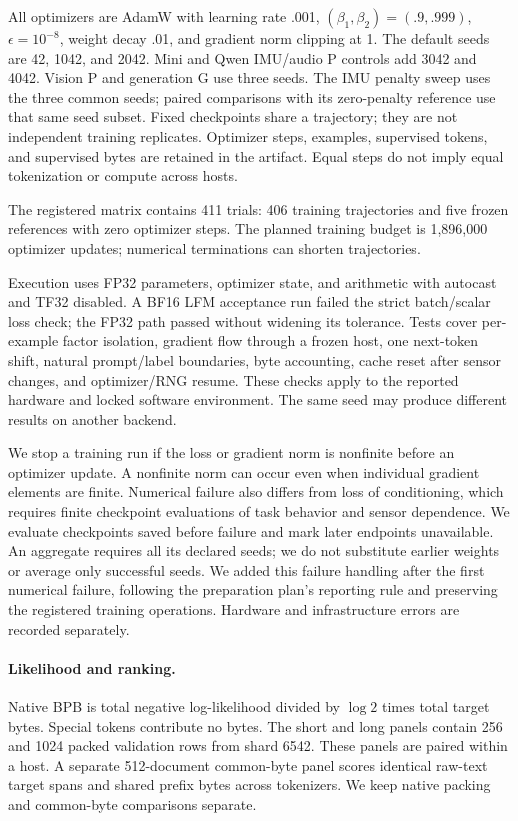 \documentclass[11pt]{article}
\begin{document}
All optimizers are AdamW with learning rate .001, $(\beta_1,\beta_2)=(.9,.999)$,
$\epsilon=10^{-8}$, weight decay .01, and gradient norm clipping at 1.
The default seeds are 42, 1042, and 2042. Mini and Qwen IMU/audio P controls add
3042 and 4042. Vision P and generation G use three seeds. The IMU penalty sweep
uses the three common seeds; paired comparisons with its zero-penalty reference
use that same seed subset. Fixed checkpoints share a trajectory; they are not
independent training replicates. Optimizer steps, examples, supervised tokens,
and supervised bytes are retained in the artifact. Equal steps do not imply
equal tokenization or compute across hosts.

The registered matrix contains 411 trials: 406 training trajectories and five
frozen references with zero optimizer steps. The planned training budget is
1,896,000 optimizer updates; numerical terminations can shorten trajectories.

Execution uses FP32 parameters, optimizer state, and arithmetic with autocast
and TF32 disabled. A BF16 LFM acceptance run failed the strict batch/scalar loss
check; the FP32 path passed without widening its tolerance. Tests cover
per-example factor isolation, gradient flow through a frozen host, one
next-token shift, natural prompt/label boundaries, byte accounting, cache
reset after sensor changes, and optimizer/RNG resume. These checks apply to the
reported hardware and locked software environment. The same seed may produce
different results on another backend.

We stop a training run if the loss or gradient norm is nonfinite before an
optimizer update. A nonfinite norm can occur even when individual gradient
elements are finite. Numerical failure also differs from loss of conditioning,
which requires finite checkpoint evaluations of task behavior and sensor
dependence. We evaluate checkpoints saved before failure and mark later
endpoints unavailable. An aggregate requires all its declared seeds; we do not
substitute earlier weights or average only successful seeds. We added this
failure handling after the first numerical failure, following the preparation
plan's reporting rule and preserving the registered training operations.
Hardware and infrastructure errors are recorded separately.

\paragraph{Likelihood and ranking.}
Native BPB is total negative log-likelihood divided by $\log 2$ times total
target bytes. Special tokens contribute no bytes. The short and long panels
contain 256 and 1024 packed validation rows from shard 6542. These panels are
paired within a host. A separate 512-document common-byte panel scores
identical raw-text target spans and shared prefix bytes across tokenizers.
We keep native packing and common-byte comparisons separate.
\end{document}
